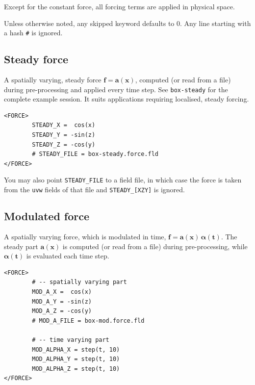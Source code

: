 \documentclass[11pt]{report}
\begin{document}
Except for the constant force, all forcing terms are applied in
physical space.

Unless otherwise noted, any skipped keyword defaults to 0. Any line
starting with a hash \verb+#+ is ignored.

\subsection{Steady force}

A spatially varying, steady force $\bm{f} = \bm{a}(\bm{x})$, computed
(or read from a file) during pre-processing and applied every time
step. See \verb|box-steady| for the complete example session. It suits
applications requiring localised, steady forcing.
\begin{verbatim}
<FORCE>
        STEADY_X =  cos(x)
        STEADY_Y = -sin(z)
        STEADY_Z = -cos(y)
        # STEADY_FILE = box-steady.force.fld
</FORCE>
\end{verbatim}

You may also point \verb+STEADY_FILE+ to a field file, in which case
the force is taken from the \verb+uvw+ fields of that file and
\verb+STEADY_[XZY]+ is ignored.

\subsection{Modulated force}

A spatially varying force, which is modulated in time, $\bm{f} =
\bm{a}(\bm{x}) \, \bm{\alpha(t)} $. The steady part $\bm{a}(\bm{x})$ is
computed (or read from a file) during pre-processing, while
$\bm{\alpha(t)}$ is evaluated each time step.
\begin{verbatim}
<FORCE>
        # -- spatially varying part
        MOD_A_X =  cos(x)
        MOD_A_Y = -sin(z)
        MOD_A_Z = -cos(y)
        # MOD_A_FILE = box-mod.force.fld

        # -- time varying part
        MOD_ALPHA_X = step(t, 10)
        MOD_ALPHA_Y = step(t, 10)
        MOD_ALPHA_Z = step(t, 10)
</FORCE>
\end{verbatim}
\end{document}
